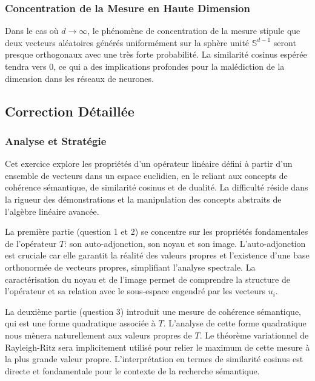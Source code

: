 \documentclass[11pt,a4paper]{report}
\begin{document}
\hypertarget{concentration-de-la-mesure-en-haute-dimension}{%
\subsubsection{Concentration de la Mesure en Haute
Dimension}\label{concentration-de-la-mesure-en-haute-dimension}}

Dans le cas où \(d \to \infty\), le phénomène de concentration de la
mesure stipule que deux vecteurs aléatoires générés uniformément sur la
sphère unité \(\mathbb{S}^{d-1}\) seront presque orthogonaux avec une
très forte probabilité. La similarité cosinus espérée tendra vers 0, ce
qui a des implications profondes pour la malédiction de la dimension
dans les réseaux de neurones.

\hypertarget{correction-duxe9tailluxe9e}{%
\subsection{Correction Détaillée}\label{correction-duxe9tailluxe9e}}

\hypertarget{analyse-et-stratuxe9gie}{%
\subsubsection{Analyse et Stratégie}\label{analyse-et-stratuxe9gie}}

Cet exercice explore les propriétés d'un opérateur linéaire défini à
partir d'un ensemble de vecteurs dans un espace euclidien, en le reliant
aux concepts de cohérence sémantique, de similarité cosinus et de
dualité. La difficulté réside dans la rigueur des démonstrations et la
manipulation des concepts abstraits de l'algèbre linéaire avancée.

La première partie (question 1 et 2) se concentre sur les propriétés
fondamentales de l'opérateur \(T\): son auto-adjonction, son noyau et
son image. L'auto-adjonction est cruciale car elle garantit la réalité
des valeurs propres et l'existence d'une base orthonormée de vecteurs
propres, simplifiant l'analyse spectrale. La caractérisation du noyau et
de l'image permet de comprendre la structure de l'opérateur et sa
relation avec le sous-espace engendré par les vecteurs \(u_i\).

La deuxième partie (question 3) introduit une mesure de cohérence
sémantique, qui est une forme quadratique associée à \(T\). L'analyse de
cette forme quadratique nous mènera naturellement aux valeurs propres de
\(T\). Le théorème variationnel de Rayleigh-Ritz sera implicitement
utilisé pour relier le maximum de cette mesure à la plus grande valeur
propre. L'interprétation en termes de similarité cosinus est directe et
fondamentale pour le contexte de la recherche sémantique.
\end{document}
